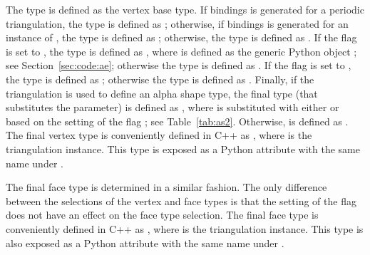 The type  is defined as the vertex base type.  If bindings is generated for a periodic triangulation, the type  is defined as ; otherwise, if bindings is generated for an instance of , the
type  is defined as ; otherwise, the type  is defined as .
%
If the \cmake{} flag  is set to , the type  is defined as , where  is defined as the generic Python object ; see Section~\ref{sec:code:ae}; otherwise the type  is defined as .
%
If the \cmake{} flag  is set to , the type  is defined as ; otherwise the type  is defined as .
%
Finally, if the triangulation is used to define an alpha shape type, the final type  (that substitutes the  parameter) is defined as
, where  is substituted with either  or  based on the setting of the \cmake{} flag ; see Table~\ref{tab:as2}. Otherwise,  is defined as .
%
The final vertex type is conveniently defined in C++ as , where  is the triangulation instance. This type is exposed as a Python attribute
with the same name under .

The final face type is determined in a similar fashion. The only difference between the selections of the vertex and face types is that the setting of the \cmake{} flag  does not have an effect on the face type selection. The final face type is conveniently defined in C++ as , where  is the triangulation instance. This type is also exposed as a Python attribute with the same name under .

